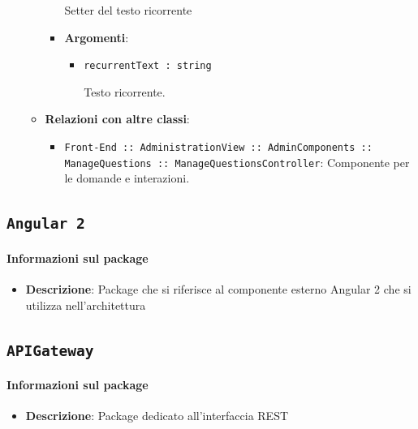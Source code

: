 \documentclass[../DefinizioneDiProdotto.tex]{subfiles}
\begin{document}
\begin{itemize}
\begin{itemize}
\begin{itemize}
	 Setter del testo ricorrente

	\item \textbf{Argomenti}:
	\begin{itemize}
	\item \texttt{recurrentText : string}\

	 Testo ricorrente.
	\end{itemize}
	\end{itemize}\vspace{0.5em}
	\item \textbf{Relazioni con altre classi}:
	\begin{itemize}
	\item \texttt{Front-End :: AdministrationView :: AdminComponents :: ManageQuestions :: ManageQuestionsController}: Componente per le domande e interazioni.
	\end{itemize}
	\end{itemize}\end{itemize}


\subsection{ \texttt{Angular 2}}\paragraph{Informazioni sul package}\begin{itemize}\item \textbf{Descrizione}: Package che si riferisce al componente esterno Angular 2 che si utilizza nell'architettura\end{itemize}

\subsection{ \texttt{APIGateway}}\paragraph{Informazioni sul package}\begin{itemize}\item \textbf{Descrizione}: Package dedicato all'interfaccia REST\end{itemize}
\end{document}
